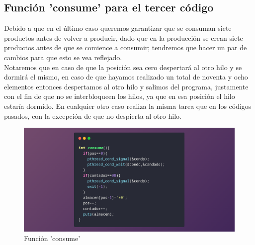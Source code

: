 \documentclass[10pt]{article}
\begin{document}
	\subsection{Función 'consume' para el tercer código}
	Debido a que en el último caso queremos garantizar que se consuman siete productos antes de volver a producir, dado que en la producción se crean siete productos antes de que se comience a consumir; tendremos que hacer un par de cambios para que esto se vea reflejado. 
	\\
	Notaremos que en caso de que la posición sea cero despertará al otro hilo y se dormirá el mismo, en caso de que hayamos realizado un total de noventa y ocho elementos entonces despertamos al otro hilo y salimos del programa, justamente con el fin de que no se interbloqueen los hilos, ya que en esa posición el hilo estaría dormido. En cualquier otro caso realiza la misma tarea que en los códigos pasados, con la excepción de que no despierta al otro hilo. 
	\begin{figure}[h!]
		\centering
		\includegraphics[width=\linewidth]{consumev2.png}
		\caption{Función 'consume'}
		\label{fig:consumev2}
	\end{figure}
	\newpage
\end{document}
